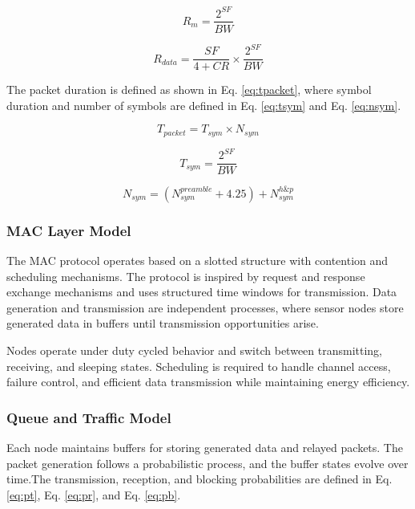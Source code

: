 \documentclass[a4paper,fleqn]{cas-dc}
\numberwithin{equation}{section}
\begin{document}
\begin{equation}
R_m = \frac{2^{SF}}{BW}
\label{eq:rm}
\end{equation}

\begin{equation}
R_{data} = \frac{SF}{4+CR} \times \frac{2^{SF}}{BW}
\label{eq:rdata}
\end{equation}

The packet duration is defined as shown in Eq. \ref{eq:tpacket}, where symbol duration and number of symbols are defined in Eq. \ref{eq:tsym} and Eq. \ref{eq:nsym}.

\begin{equation}
T_{packet} = T_{sym} \times N_{sym}
\label{eq:tpacket}
\end{equation}

\begin{equation}
T_{sym} = \frac{2^{SF}}{BW}
\label{eq:tsym}
\end{equation}

\begin{equation}
N_{sym} = (N^{preamble}_{sym} + 4.25) + N^{h\&p}_{sym}
\label{eq:nsym}
\end{equation}

\subsubsection{MAC Layer Model}

The MAC protocol operates based on a slotted structure with contention and scheduling mechanisms. The protocol is inspired by request and response exchange mechanisms and uses structured time windows for transmission. Data generation and transmission are independent processes, where sensor nodes store generated data in buffers until transmission opportunities arise.

Nodes operate under duty cycled behavior and switch between transmitting, receiving, and sleeping states. Scheduling is required to handle channel access, failure control, and efficient data transmission while maintaining energy efficiency.

\subsubsection{Queue and Traffic Model}

Each node maintains buffers for storing generated data and relayed packets. The packet generation follows a probabilistic process, and the buffer states evolve over time.The transmission, reception, and blocking probabilities are defined in Eq. \ref{eq:pt}, Eq. \ref{eq:pr}, and Eq. \ref{eq:pb}.
\end{document}
